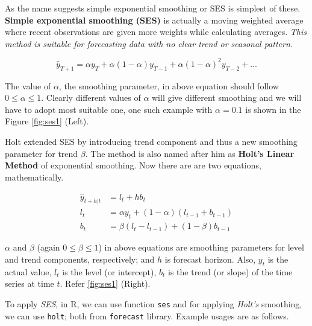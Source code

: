 \documentclass[
]{book}
\begin{document}
As the name suggests simple exponential smoothing or SES is simplest of these. \textbf{Simple exponential smoothing (SES)} is actually a moving weighted average where recent observations are given more weights while calculating averages. \emph{This method is suitable for forecasting data with no clear trend or seasonal pattern.}

\[
\hat{y}_{T+1} = \alpha{y_T} + \alpha(1- \alpha){y_{T-1}} + \alpha(1 - \alpha)^2{y_{T-2}} + ...
\]

The value of \(\alpha\), the smoothing parameter, in above equation should follow \(0 \le \alpha \le 1\). Clearly different values of \(\alpha\) will give different smoothing and we will have to adopt most suitable one, one such example with \(\alpha = 0.1\) is shown in the Figure \ref{fig:ses1} (Left).

Holt extended SES by introducing trend component and thus a new smoothing parameter for trend \(\beta\). The method is also named after him as \textbf{Holt's Linear Method} of exponential smoothing. Now there are are two equations, mathematically.

\[
\begin{aligned}
\hat{y}_{t+h|t} &= l_t + hb_t \\
l_t &= \alpha y_t + (1-\alpha)(l_{t-1} + b_{t-1}) \\
b_t &= \beta(l_t - l_{t-1}) + (1-\beta)b_{t-1}
\end{aligned}
\]

\(\alpha\) and \(\beta\) (again \(0 \le \beta \le 1\)) in above equations are smoothing parameters for level and trend components, respectively; and \(h\) is forecast horizon. Also, \(y_t\) is the actual value, \(l_t\) is the level (or intercept), \(b_t\) is the trend (or slope) of the time series at time \(t\). Refer \ref{fig:ses1} (Right).

To apply \emph{SES}, in R, we can use function \texttt{ses} and for applying \emph{Holt's} smoothing, we can use \texttt{holt}; both from \texttt{forecast} library. Example usages are as follows.
\end{document}
